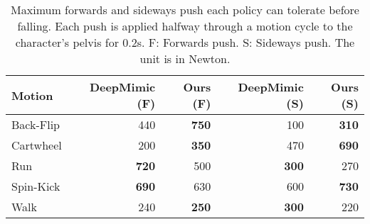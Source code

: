 \begin{table}[h]
\caption{ {Maximum forwards and sideways push each policy can tolerate before falling. Each push is applied halfway through a motion cycle to the character’s pelvis for 0.2s. F: Forwards push. S: Sideways push. The unit is in Newton.}}
\label{tab:robustness}
\begin{center}
\begin{tabular}{l|rr|rr}
\toprule
Motion & 
DeepMimic (F)& 
Ours (F)&
DeepMimic (S) &
Ours (S)\\
\midrule
Back-Flip & 440 & \textbf{750} & 100 & \textbf{310} \\
Cartwheel & 200 & \textbf{350} & 470 & \textbf{690} \\
Run & \textbf{720} & 500 & \textbf{300} & 270 \\
Spin-Kick & \textbf{690} & 630 & 600 & \textbf{730} \\
Walk & 240 & \textbf{250} & \textbf{300} & 220 \\
\bottomrule
\end{tabular}
\end{center}
\end{table}